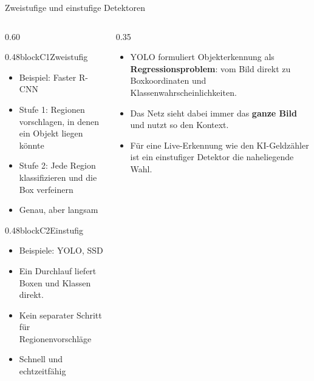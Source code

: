 \begin{frame}{Zweistufige und einstufige Detektoren}
\footnotesize
{}
\begin{columns}
\begin{column}{0.60\textwidth}
\begin{blockrow}
  \begin{blockcol}{0.48\linewidth}{blockC1}{Zweistufig}
    \begin{itemize}
      \item Beispiel: Faster R-CNN
      \item Stufe 1: Regionen vorschlagen, in denen ein Objekt liegen könnte
      \item Stufe 2: Jede Region klassifizieren und die Box verfeinern
      \item Genau, aber langsam
    \end{itemize}
  \end{blockcol}
  \begin{blockcol}{0.48\linewidth}{blockC2}{Einstufig}
    \begin{itemize}
      \item Beispiele: YOLO, SSD
      \item Ein Durchlauf liefert Boxen und Klassen direkt.
      \item Kein separater Schritt für Regionenvorschläge
      \item Schnell und echtzeitfähig
    \end{itemize}
  \end{blockcol}
\end{blockrow}
\end{column}
\begin{column}{0.35\textwidth}
\begin{itemize}
  \item YOLO formuliert Objekterkennung als \textbf{Regressionsproblem}: vom Bild direkt zu Boxkoordinaten und Klassenwahrscheinlichkeiten.
  \item Das Netz sieht dabei immer das \textbf{ganze Bild} und nutzt so den Kontext.
  \item Für eine Live-Erkennung wie den KI-Geldzähler ist ein einstufiger Detektor die naheliegende Wahl.
\end{itemize}
\end{column}
\end{columns}
\end{frame}

